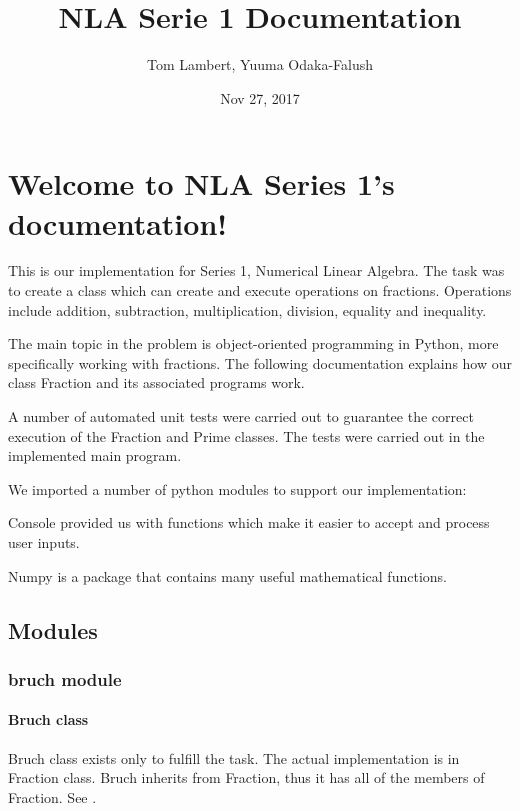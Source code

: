 \documentclass[letterpaper,10pt,english]{sphinxmanual}
\title{NLA Serie 1 Documentation}
\date{Nov 27, 2017}
\author{Tom Lambert, Yuuma Odaka-Falush}
\begin{document}
\maketitle
\sphinxtableofcontents
{}\label{\detokenize{index::doc}}



\chapter{Welcome to NLA Series 1’s documentation!}
\label{\detokenize{index:welcome-to-nla-series-1-s-documentation}}\label{\detokenize{index:nothing-to-see-here}}
This is our implementation for Series 1, Numerical Linear Algebra.
The task was to create a class which can create and execute operations on fractions.
Operations include addition, subtraction, multiplication, division, equality and inequality.

The main topic in the problem is object-oriented programming in Python, more specifically working with fractions.
The following documentation explains how our class Fraction and its associated programs work.

A number of automated unit tests were carried out to guarantee the correct execution of the Fraction and Prime classes.
The tests were carried out in the implemented main program.

We imported a number of python modules to support our implementation:

Console provided us with functions which make it easier to accept and process user inputs.

Numpy is a package that contains many useful mathematical functions.


\section{Modules}
\label{\detokenize{index:modules}}

\subsection{bruch module}
\label{\detokenize{bruch::doc}}\label{\detokenize{bruch:bruch-module}}

\subsubsection{Bruch class}
\label{\detokenize{bruch:bruch-class}}
Bruch class exists only to fulfill the task. The actual implementation is in Fraction class.
Bruch inherits from Fraction, thus it has all of the members of Fraction.
See {\hyperref[\detokenize{fraction:fraction-class}]{}}.
\label{\detokenize{bruch:module-bruch}}
\end{document}
